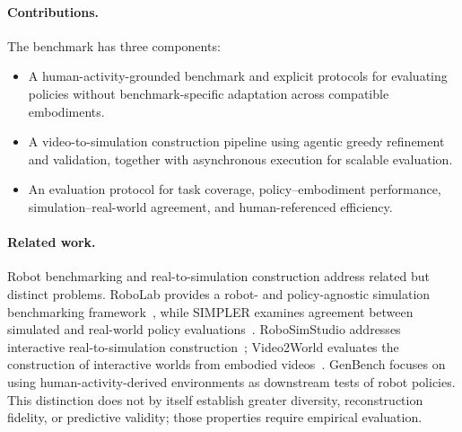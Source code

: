 \paragraph{Contributions.}
The benchmark has three components:
\begin{itemize}
\item A human-activity-grounded benchmark and explicit protocols for evaluating policies without benchmark-specific adaptation across compatible embodiments.
\item A video-to-simulation construction pipeline using agentic greedy refinement and validation, together with asynchronous execution for scalable evaluation.
\item An evaluation protocol for task coverage, policy--embodiment performance, simulation--real-world agreement, and human-referenced efficiency.
\end{itemize}

\paragraph{Related work.}
Robot benchmarking and real-to-simulation construction address related but distinct problems. RoboLab provides a robot- and policy-agnostic simulation benchmarking framework~\cite{gbRoboLab}, while SIMPLER examines agreement between simulated and real-world policy evaluations~\cite{gbSimpler}. RoboSimStudio addresses interactive real-to-simulation construction~\cite{gbRoboSimStudio}; Video2World evaluates the construction of interactive worlds from embodied videos~\cite{gbVideo2World}. GenBench focuses on using human-activity-derived environments as downstream tests of robot policies. This distinction does not by itself establish greater diversity, reconstruction fidelity, or predictive validity; those properties require empirical evaluation.
